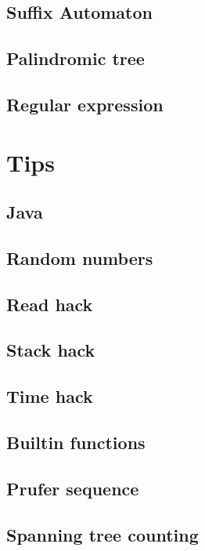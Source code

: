 \documentclass[titlepage, a4paper,10pt]{article}
\begin{document}
\begin{multicols}{2}
\begin{spacing}{0.6}
{			\subsection{Suffix Automaton}
				
			\subsection{Palindromic tree}
				
			\subsection{Regular expression}
				
		\section{Tips}
			\subsection{Java}
				
			\subsection{Random numbers}
				
			\subsection{Read hack}
				
			\subsection{Stack hack}
				
			\subsection{Time hack}
				
			\subsection{Builtin functions}
				
			\subsection{Prufer sequence}
				
			\subsection{Spanning tree counting}
				
}
\end{spacing}
\end{multicols}
\end{document}
